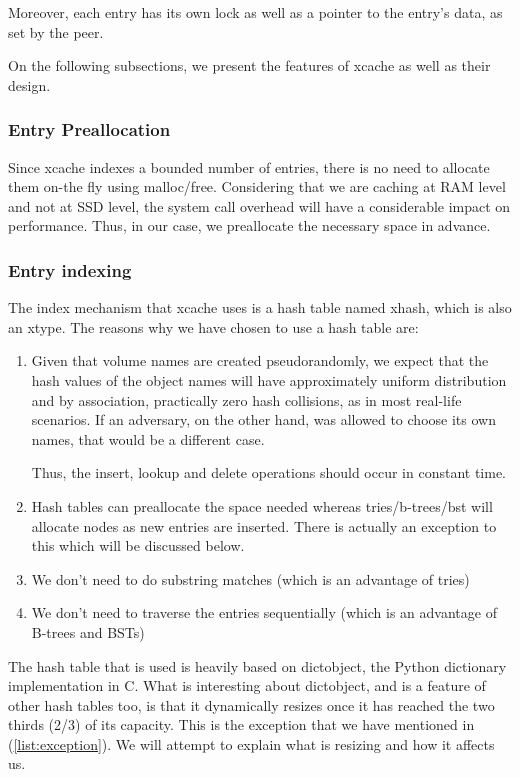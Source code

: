 Moreover, each entry has its own lock as well as a pointer to the entry's data, 
as set by the peer.

On the following subsections, we present the features of xcache as well as 
their design.

\subsubsection{Entry Preallocation}\label{sec:xcache-entry-design}

Since xcache indexes a bounded number of entries, there is no need to allocate 
them on-the fly using malloc/free. Considering that we are caching at RAM level 
and not at SSD level, the system call overhead will have a considerable impact 
on performance. Thus, in our case, we preallocate the necessary space in 
advance.

\subsubsection{Entry indexing}\label{sec:xcache-index-design}

The index mechanism that xcache uses is a hash table named xhash, which is also 
an xtype. The reasons why we have chosen to use a hash table are:

\begin{enumerate}
	\item Given that volume names are created pseudorandomly, we expect 
		that the hash values of the object names will have 
		approximately uniform distribution and by association, 
		practically zero hash collisions, as in most real-life 
		scenarios. If an adversary, on the other hand, was allowed to 
		choose its own names, that would be a different case.

		Thus, the insert, lookup and delete operations should occur in 
		constant time.
	\item Hash tables can preallocate the space needed whereas 
		tries/b-trees/bst will allocate nodes as new entries are 
		inserted. There is actually an exception to this which will be 
		discussed below. \label{list:exception}
	\item We don't need to do substring matches (which is an advantage of 
		tries)
	\item We don't need to traverse the entries sequentially (which is an 
		advantage of B-trees and BSTs)
\end{enumerate}

The hash table that is used is heavily based on dictobject\cite{dictobject},
the Python dictionary implementation in C. What is interesting about 
dictobject, and is a feature of other hash tables too, is that it dynamically
resizes once it has reached the two thirds (2/3) of its capacity. This is the 
exception that we have mentioned in (\ref{list:exception}). We will attempt to 
explain what is resizing and how it affects us.


